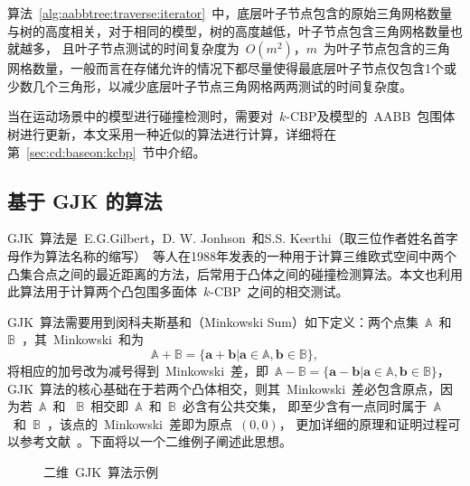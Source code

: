 算法~\ref{alg:aabbtree:traverse:iterator}~中，底层叶子节点包含的原始三角网格数量与树的高度相关，对于相同的模型，树的高度越低，叶子节点包含三角网格数量也就越多，
且叶子节点测试的时间复杂度为~$O(m^2)$，$m$~为叶子节点包含的三角网格数量，一般而言在存储允许的情况下都尽量使得最底层叶子节点仅包含1个或少数几个三角形，以减少底层叶子节点三角网格两两测试的时间复杂度。

当在运动场景中的模型进行碰撞检测时，需要对~$k$-CBP及模型的~AABB~包围体树进行更新，本文采用一种近似的算法进行计算，详细将在第~\ref{sec:cd:baseon:kcbp}~节中介绍。

\subsection{基于 GJK 的算法}
\label{subsec:kcbp:cd:gjk}

GJK~算法是~E.G.Gilbert，D. W. Jonhson~和S.S. Keerthi（取三位作者姓名首字母作为算法名称的缩写）~等人在1988年发表的一种用于计算三维欧式空间中两个凸集合点之间的最近距离的方法\cite{gilbert1988fast}，后常用于凸体之间的碰撞检测算法\cite{bergen1999fast}。本文也利用此算法用于计算两个凸包围多面体~$k$-CBP~之间的相交测试。

GJK~算法需要用到闵科夫斯基和（Minkowski Sum）如下定义：两个点集~$\mathbb{A}$~和~$\mathbb{B}$~，其~Minkowski~和为
\begin{equation}
  \mathbb{A} + \mathbb{B} = \{ \bm{a} + \bm{b} | \bm{a} \in \mathbb{A}, \bm{b} \in \mathbb{B}\},  
  \label{}
\end{equation}
将相应的加号改为减号得到~Minkowski~差，即~$\mathbb{A} - \mathbb{B} = \{ \bm{a} - \bm{b} | \bm{a} \in \mathbb{A}, \bm{b} \in \mathbb{B}\} $，GJK~算法的核心基础在于若两个凸体相交，则其~Minkowski~差必包含原点，因为若~$\mathbb{A}$~和
~$\mathbb{B}$~相交即~$\mathbb{A}$~和~$\mathbb{B}$~必含有公共交集，
即至少含有一点同时属于~$\mathbb{A}$~和~$\mathbb{B}$~，该点的~Minkowski~差即为原点~$(0, 0)$，
更加详细的原理和证明过程可以参考文献~。下面将以一个二维例子阐述此思想。

\begin{figure}[H]
\centering
{} 
\caption{二维~GJK~算法示例}
\label{fig:gjk:example:2d}
\end{figure}


